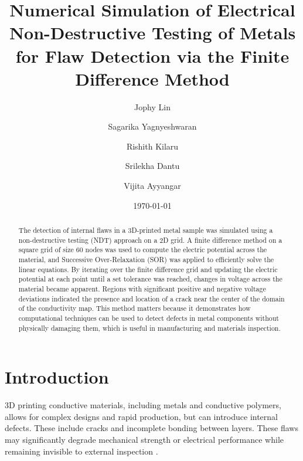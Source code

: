 \documentclass[reprint,amsmath,amssymb,aps]{revtex4-2}
\begin{document}
\title{Numerical Simulation of Electrical Non-Destructive Testing of Metals for Flaw Detection via the Finite Difference Method}

\author{Jophy Lin}
\author{Sagarika Yagnyeshwaran}
\author{Rishith Kilaru}
\author{Srilekha Dantu}
\author{Vijita Ayyangar}

\date{\today}

\begin{abstract}

The detection of internal flaws in a 3D-printed metal sample was simulated using a non-destructive testing (NDT) approach on a 2D grid. A finite difference method on a square grid of size 60 nodes was used to compute the electric potential across the material, and Successive Over-Relaxation (SOR) was applied to efficiently solve the linear equations. By iterating over the finite difference grid and updating the electric potential at each point until a set tolerance was reached, changes in voltage across the material became apparent. Regions with significant positive and negative voltage deviations indicated the presence and location of a crack near the center of the domain of the conductivity map. This method matters because it demonstrates how computational techniques can be used to detect defects in metal components without physically damaging them, which is useful in manufacturing and materials inspection.

\end{abstract}


\maketitle

\section{Introduction}

3D printing conductive materials, including metals and conductive polymers, allows for complex designs and rapid production, but can introduce internal defects. These include cracks and incomplete bonding between layers. These flaws may significantly degrade mechanical strength or electrical performance while remaining invisible to external inspection \cite{1}.
\end{document}
